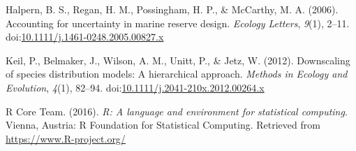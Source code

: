 \documentclass[12pt,]{article}
\begin{document}
\hypertarget{refs}{}
\hypertarget{ref-Halpern_2006}{}
Halpern, B. S., Regan, H. M., Possingham, H. P., \& McCarthy, M. A.
(2006). Accounting for uncertainty in marine reserve design.
\emph{Ecology Letters}, \emph{9}(1), 2--11.
doi:\href{https://doi.org/10.1111/j.1461-0248.2005.00827.x}{10.1111/j.1461-0248.2005.00827.x}

\hypertarget{ref-Keil_2012}{}
Keil, P., Belmaker, J., Wilson, A. M., Unitt, P., \& Jetz, W. (2012).
Downscaling of species distribution models: A hierarchical approach.
\emph{Methods in Ecology and Evolution}, \emph{4}(1), 82--94.
doi:\href{https://doi.org/10.1111/j.2041-210x.2012.00264.x}{10.1111/j.2041-210x.2012.00264.x}

\hypertarget{ref-R_Core_Team_2016}{}
R Core Team. (2016). \emph{R: A language and environment for statistical
computing}. Vienna, Austria: R Foundation for Statistical Computing.
Retrieved from \url{https://www.R-project.org/}
\end{document}
